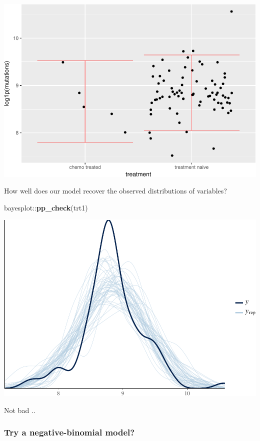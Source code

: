 \documentclass[]{article}
\newenvironment{Shaded}{\begin{snugshade}}{\end{snugshade}}
\newcommand{\KeywordTok}[1]{\textcolor[rgb]{0.13,0.29,0.53}{\textbf{{#1}}}}
\newcommand{\NormalTok}[1]{{#1}}
\begin{document}
\includegraphics{Hierarchical_model_mutations_and_peptides_files/figure-latex/psolid-trt1-ppred-1.pdf}

How well does our model recover the observed distributions of variables?

\begin{Shaded}
\begin{Highlighting}[]
\NormalTok{bayesplot::}\KeywordTok{pp_check}\NormalTok{(trt1)}
\end{Highlighting}
\end{Shaded}

\includegraphics{Hierarchical_model_mutations_and_peptides_files/figure-latex/psolid-trt1-ppcheck-1.pdf}

Not bad ..

\subsubsection{Try a negative-binomial
model?}\label{try-a-negative-binomial-model}
\end{document}
